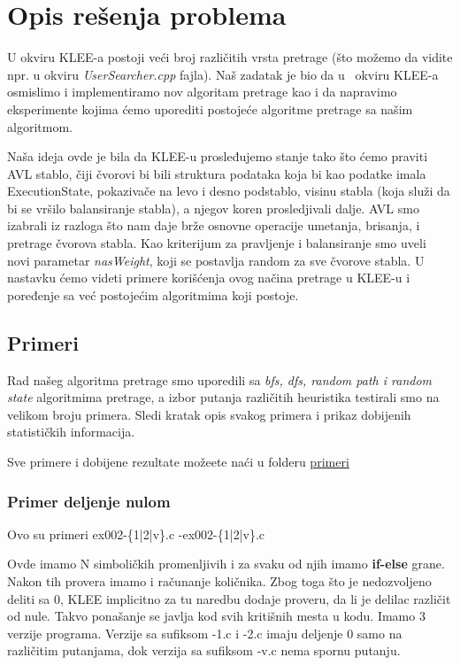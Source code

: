 \documentclass[a4paper]{article}
\begin{document}
{\section{Opis rešenja problema}
\label{sec:opis}
 	
 	U okviru KLEE-a postoji veći broj različitih vrsta pretrage (što možemo da vidite npr. u okviru \textit{UserSearcher.cpp} fajla). Naš zadatak je bio da u 
 	okviru KLEE-a osmislimo i implementiramo nov algoritam pretrage kao i da napravimo eksperimente kojima ćemo uporediti postojeće algoritme pretrage sa našim algoritmom.
 	
 	Naša ideja ovde je bila da KLEE-u prosleđujemo stanje tako što ćemo praviti AVL stablo, čiji čvorovi bi bili struktura podataka koja bi kao podatke imala ExecutionState, pokazivače na levo i desno podstablo, visinu stabla (koja služi da bi se vršilo balansiranje stabla), a njegov koren prosledjivali dalje. AVL smo izabrali iz razloga što nam daje brže osnovne operacije umetanja, brisanja, i pretrage čvorova stabla. Kao kriterijum za pravljenje i balansiranje smo uveli novi parametar \textit{nasWeight}, koji se postavlja random za sve čvorove stabla. U nastavku ćemo videti primere korišćenja ovog načina pretrage u KLEE-u  i poređenje sa već postojećim algoritmima koji postoje.
 	
 	\subsection{Primeri}
 	
 	Rad našeg algoritma pretrage smo uporedili sa \textit{bfs, dfs, random path i random state} algoritmima pretrage, a izbor putanja različitih heuristika testirali smo na velikom broju primera. Sledi kratak opis svakog primera i prikaz dobijenih statističkih informacija.
 	
 	Sve primere i dobijene rezultate možeete naći u folderu \href{primeri/.}{primeri}
 	
 	\subsubsection{Primer deljenje nulom}
 	
	 	Ovo su primeri ex002-\{1|2|v\}.c -ex002-\{1|2|v\}.c
	 	
	 	Ovde imamo N simboličkih promenljivih i za svaku od njih imamo \textbf{if-else} grane. Nakon tih provera imamo i računanje količnika. Zbog toga što je nedozvoljeno deliti sa 0, KLEE implicitno za tu naredbu dodaje proveru, da li je delilac različit od nule. Takvo ponašanje se javlja kod svih kritišnih mesta u kodu. Imamo 3 verzije programa. Verzije sa sufiksom -1.c i -2.c imaju deljenje 0 samo na različitim putanjama, dok verzija sa sufiksom -v.c nema spornu putanju.
	 	
}
\end{document}
